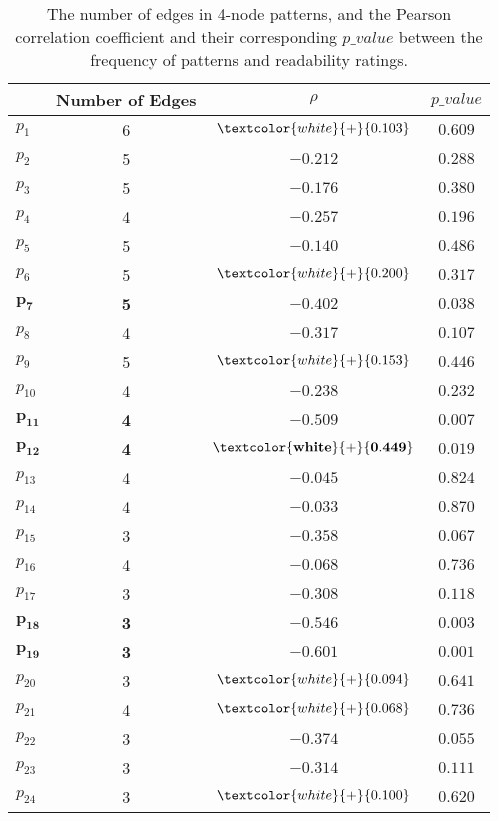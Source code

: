 \begin{table}[!ht]
	\begin{center}
		\begin{tabular}{lccc}
			\hline
   								& Number of Edges & $\rho$ 						 	& $p\_value$				\\
   			\hline
			$p_1$ 				& 6 			  & $\textcolor{white}{+}{0.103}$ 	& $0.609$					\\
			$p_2$ 				& 5 			  & $-0.212$ 					 	& $0.288$					\\
			$p_3$  				& 5				  & $-0.176$				     	& $0.380$					\\
			$p_4$  				& 4 			  & $-0.257$ 				     	& $0.196$					\\
			$p_5$ 				& 5 			  & $-0.140$ 					 	& $0.486$					\\
			$p_6$  				& 5 			  & $\textcolor{white}{+}{0.200}$  	& $0.317$					\\
			$\mathbf{p_7}$ 	& \textbf{5} 	  & $\mathbf{-0.402}$ 			 	& $\mathbf{0.038}$			\\
			$p_8$  				& 4 			  & $-0.317$ 					 	& $0.107$					\\
			$p_9$ 				& 5 			  & $\textcolor{white}{+}{0.153}$  	& $0.446$					\\
			$p_{10}$ 			& 4 			  & $-0.238$ 					 	& $0.232$					\\
			$\mathbf{p_{11}}$ 	& \textbf{4} 	  & $\mathbf{-0.509}$            	& $\mathbf{0.007}$			\\
			$\mathbf{p_{12}}$  	& \textbf{4} 	  & $\mathbf{\textcolor{white}{+}{0.449}}$ & $\mathbf{0.019}$	\\
			$p_{13}$			& 4 			  & $-0.045$ 						& $0.824$					\\
			$p_{14}$			& 4 			  & $-0.033$ 						& $0.870$					\\
			$p_{15}$			& 3				  & $-0.358$ 						& $0.067$					\\
			$p_{16}$ 			& 4 			  & $-0.068$ 						& $0.736$					\\
			$p_{17}$			& 3 			  & $-0.308$ 						& $0.118$					\\
			$\mathbf{p_{18}}$	& \textbf{3}	  & $\mathbf{-0.546}$				& $\mathbf{0.003}$			\\
			$\mathbf{p_{19}}$	& \textbf{3} 	  & $\mathbf{-0.601}$ 				& $\mathbf{0.001}$			\\
			$p_{20}$			& 3 			  & $\textcolor{white}{+}{0.094}$   & $0.641$					\\
			$p_{21}$			& 4 			  & $\textcolor{white}{+}{0.068}$	& $0.736$				    \\
			$p_{22}$			& 3				  & $-0.374$ 						& $0.055$					\\
			$p_{23}$			& 3				  & $-0.314$ 						& $0.111$					\\
			$p_{24}$ 			& 3				  & $\textcolor{white}{+}{0.100}$   & $0.620$					\\
			\hline
		\end{tabular}
	\end{center}
	\caption{The number of edges in 4-node patterns, and the Pearson correlation coefficient and their corresponding $p\_value$ between the frequency of patterns and readability ratings.} 
	\label{tab:correlation-4node}
\end{table}

